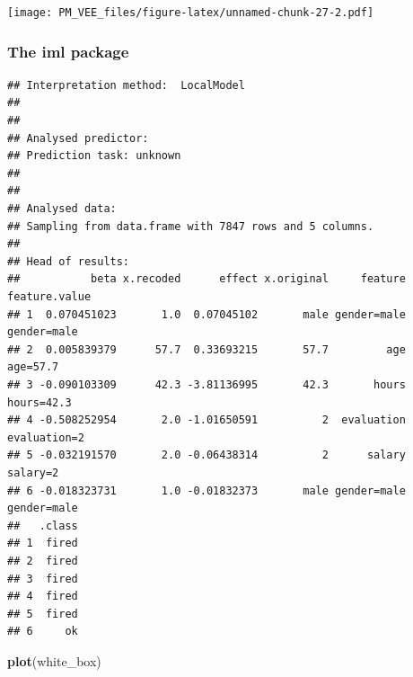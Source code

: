 \documentclass[]{krantz}
\newenvironment{Shaded}{\begin{snugshade}}{\end{snugshade}}
\newcommand{\DataTypeTok}[1]{\textcolor[rgb]{0.13,0.29,0.53}{#1}}
\newcommand{\DecValTok}[1]{\textcolor[rgb]{0.00,0.00,0.81}{#1}}
\newcommand{\KeywordTok}[1]{\textcolor[rgb]{0.13,0.29,0.53}{\textbf{#1}}}
\newcommand{\NormalTok}[1]{#1}
\newcommand{\OperatorTok}[1]{\textcolor[rgb]{0.81,0.36,0.00}{\textbf{#1}}}
\newcommand{\StringTok}[1]{\textcolor[rgb]{0.31,0.60,0.02}{#1}}
\theoremstyle{definition}
\theoremstyle{definition}
\theoremstyle{definition}
\theoremstyle{remark}
\begin{document}
\texttt{[image: PM\_VEE\_files/figure-latex/unnamed-chunk-27-2.pdf]}

\hypertarget{the-iml-package}{%
\subsubsection{\texorpdfstring{\textbf{The iml
package}}{The iml package}}\label{the-iml-package}}

\begin{Shaded}
\end{Shaded}

\begin{verbatim}
## Interpretation method:  LocalModel 
## 
## 
## Analysed predictor: 
## Prediction task: unknown 
## 
## 
## Analysed data:
## Sampling from data.frame with 7847 rows and 5 columns.
## 
## Head of results:
##           beta x.recoded      effect x.original     feature feature.value
## 1  0.070451023       1.0  0.07045102       male gender=male   gender=male
## 2  0.005839379      57.7  0.33693215       57.7         age      age=57.7
## 3 -0.090103309      42.3 -3.81136995       42.3       hours    hours=42.3
## 4 -0.508252954       2.0 -1.01650591          2  evaluation  evaluation=2
## 5 -0.032191570       2.0 -0.06438314          2      salary      salary=2
## 6 -0.018323731       1.0 -0.01832373       male gender=male   gender=male
##   .class
## 1  fired
## 2  fired
## 3  fired
## 4  fired
## 5  fired
## 6     ok
\end{verbatim}

\begin{Shaded}
\begin{Highlighting}[]
\KeywordTok{plot}\NormalTok{(white_box)}
\end{Highlighting}
\end{Shaded}
\end{document}
